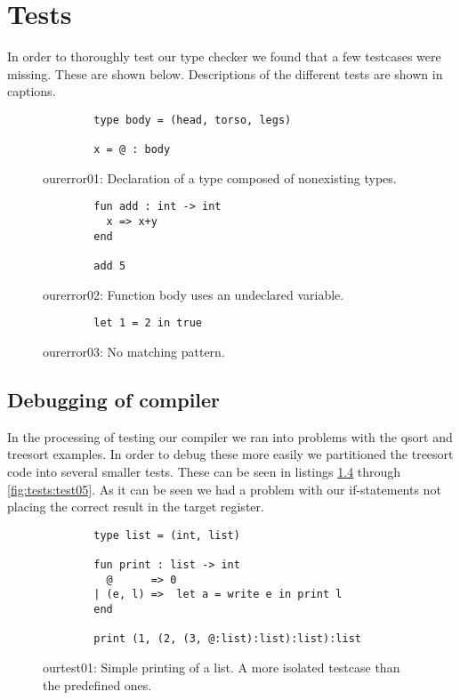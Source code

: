 \chapter{Tests}
In order to thoroughly test our type checker we found that a few testcases
were missing. These are shown below. Descriptions of the different tests are
shown in captions.

\begin{figure}
    \centering
    \begin{lstlisting}
        type body = (head, torso, legs)

        x = @ : body
    \end{lstlisting}
    \label{fig:tests:error01}
    \caption{ourerror01: Declaration of a type composed of nonexisting types.}
\end{figure}

\begin{figure}
    \centering
    \begin{lstlisting}
        fun add : int -> int
          x => x+y
        end

        add 5
    \end{lstlisting}
    \label{fig:tests:error02}
    \caption{ourerror02: Function body uses an undeclared variable.}
\end{figure}

\begin{figure}
    \centering
    \begin{lstlisting}
        let 1 = 2 in true
    \end{lstlisting}
    \label{fig:tests:error03}
    \caption{ourerror03: No matching pattern.}
\end{figure}


\section{Debugging of compiler}
In the processing of testing our compiler we ran into problems with the qsort
and treesort examples. In order to debug these more easily we partitioned the
treesort code into several smaller tests. These can be seen in listings
\ref{fig:tests:test01} through \ref{fig:tests:test05}. As it can be seen we
had a problem with our if-statements not placing the correct result in the
target register.

\begin{figure}
    \centering
    \begin{lstlisting}
        type list = (int, list)

        fun print : list -> int
          @      => 0
        | (e, l) =>  let a = write e in print l
        end

        print (1, (2, (3, @:list):list):list):list
    \end{lstlisting}
    \label{fig:tests:test01}
    \caption{ourtest01: Simple printing of a list. A more isolated testcase 
             than the predefined ones.}
\end{figure}

